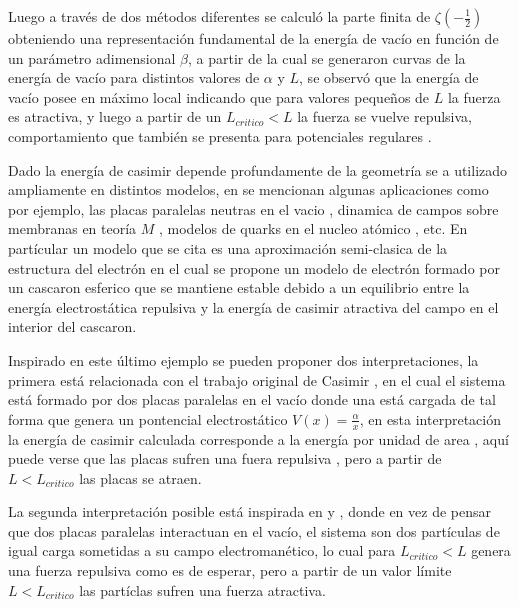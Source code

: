 Luego a través de dos métodos diferentes se calculó la parte finita de $\zeta \left( - \frac{1}{2} \right)$ obteniendo una representación fundamental de la energía de vacío en función de un parámetro adimensional $\beta$, a partir de la cual se generaron curvas de la energía de vacío para distintos valores de $\alpha$ y $L$, se observó que la energía de vacío posee en máximo local indicando que para valores pequeños de $L$ la fuerza es atractiva, y luego a partir de un $L _{critico} < L $ la fuerza se vuelve repulsiva, comportamiento que también se presenta para potenciales regulares \cite{Beauregard_2013}.

Dado la energía de casimir depende profundamente de la geometría se a utilizado ampliamente en distintos modelos, en \cite{Blau:1988kv} se mencionan algunas aplicaciones como por ejemplo, las placas paralelas neutras en el vacio \cite{PLUNIEN198687}, dinamica de campos sobre membranas en teoría $M$ \cite{DEWIT1988545}, modelos de quarks en el nucleo atómico \cite{PhysRevD.14.2622}, etc. En partícular un modelo que se cita es una aproximación semi-clasica de la estructura del electrón \cite{MILTON198049} en el cual se propone un modelo de electrón formado por un cascaron esferico que se mantiene estable debido a un equilibrio entre la  energía electrostática repulsiva y la energía de casimir atractiva del campo en el interior del cascaron.

Inspirado en este último ejemplo se pueden proponer dos interpretaciones, la primera está relacionada con el trabajo original de Casimir \cite{Casimir:1948dh}, en el cual el sistema está formado por dos placas paralelas en el vacío donde una está cargada de tal forma que genera un pontencial electrostático $V (x) = \frac{\alpha}{x}$, en esta interpretación la energía de casimir calculada corresponde a la energía por unidad de area \cite{Blau:1988kv}, aquí puede verse que las placas sufren una fuera repulsiva , pero a partir de  $L < L _{critico}$ las placas se atraen. 

La segunda interpretación posible está inspirada en \cite{MILTON198049} y \cite{Beauregard_2013}, donde en vez de pensar que dos placas paralelas interactuan en el vacío, el sistema son dos partículas de igual carga sometidas a su campo electromanético, lo cual para $L _{critico} < L$ genera una fuerza repulsiva como es de esperar, pero a partir de un valor límite $L < L _{critico}$ las partíclas sufren una fuerza atractiva.









